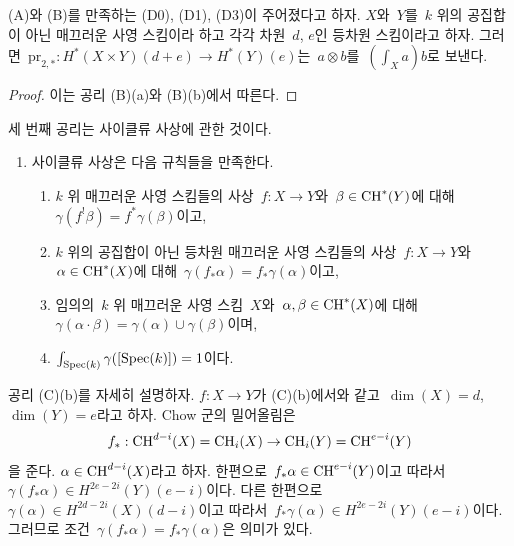 \begin{lemma}
\label{lemma-pr2star}
(A)와 (B)를 만족하는 (D0), (D1), (D3)이 주어졌다고 하자.
$X$와\  $Y$를\  $k$ 위의 공집합이 아닌 매끄러운 사영 스킴이라 하고
각각 차원\  $d$, $e$인 등차원 스킴이라고 하자. 그러면\ 
$\text{pr}_{2, *} : H^*(X \times Y)(d + e) \to H^*(Y)(e)$는\ 
$a \otimes b$를\  $(\int_X a) b$로 보낸다.
\end{lemma}

\begin{proof}
이는 공리 (B)(a)와 (B)(b)에서 따른다.
\end{proof}

\noindent
세 번째 공리는 사이클류 사상에 관한 것이다.
\begin{enumerate}
\item[(C)] 사이클류 사상은 다음 규칙들을 만족한다.
\begin{enumerate}
\item $k$ 위 매끄러운 사영 스킴들의 사상\  $f : X \to Y$와\ 
$\beta \in \mathop{\mathrm{CH}}\nolimits^*(Y)$에 대해\  $\gamma(f^!\beta) = f^*\gamma(\beta)$이고,
\item $k$ 위의 공집합이 아닌 등차원 매끄러운 사영 스킴들의 사상\ 
$f : X \to Y$와\  $\alpha \in \mathop{\mathrm{CH}}\nolimits^*(X)$에 대해\ 
$\gamma(f_*\alpha) = f_*\gamma(\alpha)$이고,
\item 임의의\  $k$ 위 매끄러운 사영 스킴\  $X$와\ 
$\alpha, \beta \in \mathop{\mathrm{CH}}\nolimits^*(X)$에 대해\ 
$\gamma(\alpha \cdot \beta) = \gamma(\alpha) \cup \gamma(\beta)$이며,
\item $\int_{\mathop{\mathrm{Spec}}(k)} \gamma([\mathop{\mathrm{Spec}}(k)]) = 1$이다.
\end{enumerate}
\end{enumerate}
공리 (C)(b)를 자세히 설명하자. $f : X \to Y$가 (C)(b)에서와 같고\ 
$\dim(X) = d$, $\dim(Y) = e$라고 하자. Chow 군의 밀어올림은
$$
f_* : \mathop{\mathrm{CH}}\nolimits^{d - i}(X) = \mathop{\mathrm{CH}}\nolimits_i(X) \to \mathop{\mathrm{CH}}\nolimits_i(Y) = \mathop{\mathrm{CH}}\nolimits^{e - i}(Y)
$$
을 준다. $\alpha \in \mathop{\mathrm{CH}}\nolimits^{d - i}(X)$라고 하자. 한편으로\ 
$f_*\alpha \in \mathop{\mathrm{CH}}\nolimits^{e - i}(Y)$이고 따라서\ 
$\gamma(f_*\alpha) \in H^{2e - 2i}(Y)(e - i)$이다. 다른 한편으로\ 
$\gamma(\alpha) \in H^{2d - 2i}(X)(d - i)$이고 따라서\ 
$f_*\gamma(\alpha) \in H^{2e - 2i}(Y)(e - i)$이다. 그러므로 조건\ 
$\gamma(f_*\alpha) = f_*\gamma(\alpha)$은 의미가 있다.

